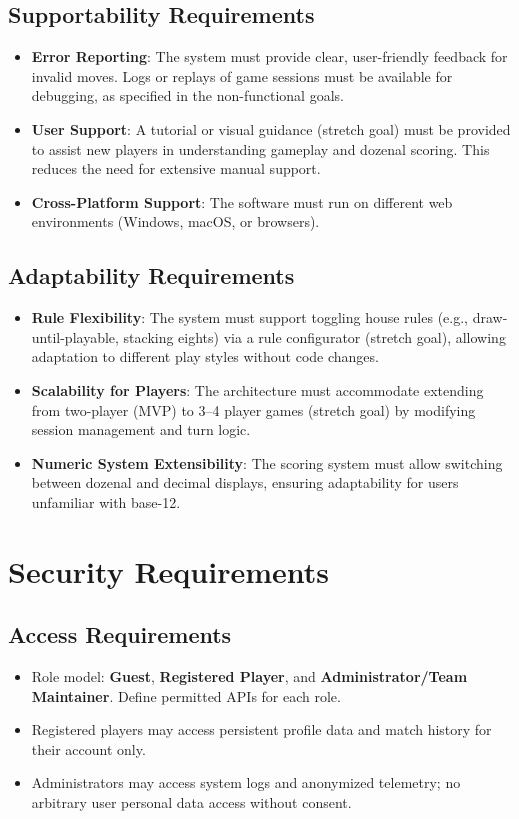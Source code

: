 \documentclass[12pt]{article}
\begin{document}
\subsection{Supportability Requirements}

\begin{itemize}
    \item \textbf{Error Reporting}: The system must provide clear, user-friendly feedback for invalid moves. Logs or replays of game sessions must be available for debugging, as specified in the non-functional goals.
    \item \textbf{User Support}: A tutorial or visual guidance (stretch goal) must be provided to assist new players in understanding gameplay and dozenal scoring. This reduces the need for extensive manual support.
    \item \textbf{Cross-Platform Support}: The software must run on different web environments (Windows, macOS, or browsers). 
\end{itemize}

\subsection{Adaptability Requirements}

\begin{itemize}
    \item \textbf{Rule Flexibility}: The system must support toggling house rules (e.g., draw-until-playable, stacking eights) via a rule configurator (stretch goal), allowing adaptation to different play styles without code changes.
    \item \textbf{Scalability for Players}: The architecture must accommodate extending from two-player (MVP) to 3--4 player games (stretch goal) by modifying session management and turn logic.
    \item \textbf{Numeric System Extensibility}: The scoring system must allow switching between dozenal and decimal displays, ensuring adaptability for users unfamiliar with base-12.
\end{itemize}

\section{Security Requirements}
\subsection{Access Requirements}
\begin{itemize}
  \item Role model: \textbf{Guest}, \textbf{Registered Player}, and \textbf{Administrator/Team Maintainer}. Define permitted APIs for each role.
  \item Registered players may access persistent profile data and match history for their account only.
  \item Administrators may access system logs and anonymized telemetry; no arbitrary user personal data access without consent.
\end{itemize}
\end{document}
